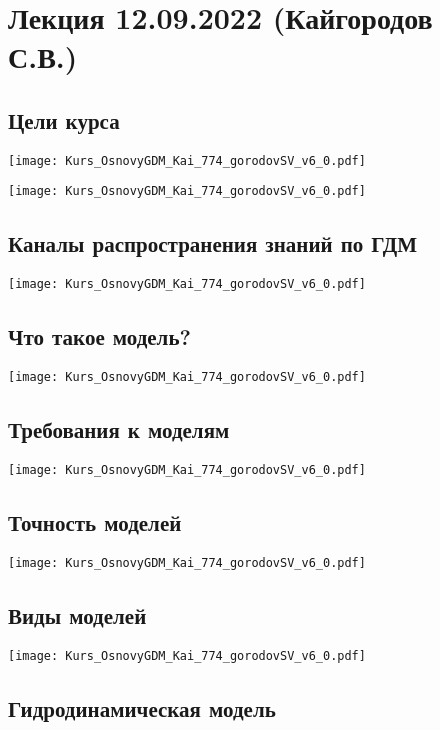 \documentclass[main.tex]{subfiles}
\begin{document}
\section{Лекция 12.09.2022 (Кайгородов С.В.)}

\subsection{Цели курса}

\texttt{[image: Kurs\_OsnovyGDM\_Kai\_774\_gorodovSV\_v6\_0.pdf]}

\texttt{[image: Kurs\_OsnovyGDM\_Kai\_774\_gorodovSV\_v6\_0.pdf]}

\subsection{Каналы распространения знаний по ГДМ}

\texttt{[image: Kurs\_OsnovyGDM\_Kai\_774\_gorodovSV\_v6\_0.pdf]}

\subsection{Что такое модель?}

\texttt{[image: Kurs\_OsnovyGDM\_Kai\_774\_gorodovSV\_v6\_0.pdf]}

\subsection{Требования к моделям}

\texttt{[image: Kurs\_OsnovyGDM\_Kai\_774\_gorodovSV\_v6\_0.pdf]}

\subsection{Точность моделей}

\texttt{[image: Kurs\_OsnovyGDM\_Kai\_774\_gorodovSV\_v6\_0.pdf]}

\subsection{Виды моделей}

\texttt{[image: Kurs\_OsnovyGDM\_Kai\_774\_gorodovSV\_v6\_0.pdf]}

\subsection{Гидродинамическая модель}
\end{document}
